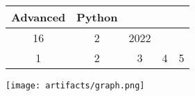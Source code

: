 \documentclass{article}
\begin{document}
\begin{tabular}{|c|c|c|c|c|}
\hline

Advanced&Python&&&\\ \hline
16&2&2022&&\\ \hline
1&2&3&4&5
\\ \hline
\end{tabular}


\texttt{[image: artifacts/graph.png]}
\end{document}
